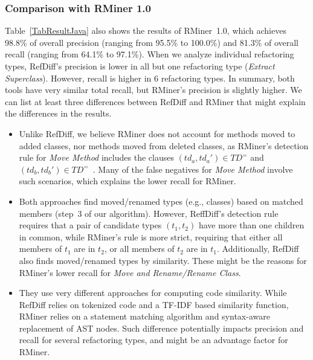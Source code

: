 \documentclass[10pt,journal,compsoc]{IEEEtran}
\begin{document}
\subsubsection{Comparison with RMiner 1.0}

Table~\ref{TabResultJava} also shows the results of RMiner~1.0, which achieves 98.8\% of overall precision (ranging from 95.5\% to 100.0\%) and 81.3\% of overall recall (ranging from 64.1\% to 97.1\%).
When we analyze individual refactoring types, RefDiff's precision is lower in all but one refactoring type (\emph{Extract Superclass}). However, recall is higher in 6 refactoring types.
In summary, both tools have very similar total recall, but RMiner's precision is slightly higher.
We can list at least three differences between RefDiff and RMiner that might explain the differences in the results.
\begin{itemize}

\item Unlike RefDiff, we believe RMiner does not account for methods moved to added classes, nor methods moved from deleted classes, as RMiner's detection rule for \emph{Move Method} includes the clauses $(\mathit{td}_a, \mathit{td}_a') \in TD^=$ and $(\mathit{td}_b, \mathit{td}_b') \in TD^=$~\cite{tsantalis2018rminer}.
Many of the false negatives for \emph{Move Method} involve such scenarios, which explains the lower recall for RMiner.


\item Both approaches find moved/renamed types (e.g., classes) based on matched members (step~3 of our algorithm). However, ReffDiff's detection rule requires that a pair of candidate types $(t_1, t_2)$ have more than one children in common, while RMiner's rule is more strict, requiring that either all members of $t_1$ are in $t_2$, or all members of $t_2$ are in $t_1$.
Additionally, RefDiff also finds moved/renamed types by similarity. 
These might be the reasons for RMiner's lower recall for \emph{Move and Rename/Rename Class}.

\item They use very different approaches for computing code similarity. While RefDiff relies on tokenized code and a TF-IDF based similarity function, RMiner relies on a statement matching algorithm and syntax-aware replacement of AST nodes.
Such difference potentially impacts precision and recall for several refactoring types, and might be an advantage factor for RMiner.
\end{itemize}
\end{document}
